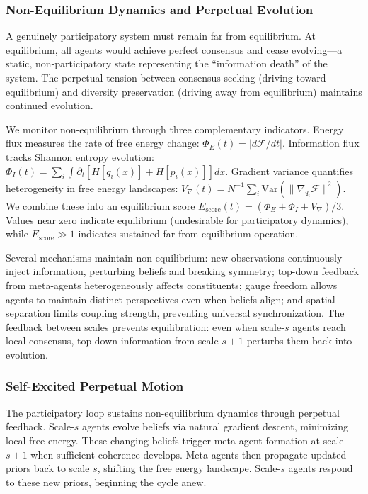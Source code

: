 \documentclass[11pt]{article}
\begin{document}
\subsubsection{Non-Equilibrium Dynamics and Perpetual Evolution}

A genuinely participatory system must remain far from equilibrium. At equilibrium, all agents would achieve perfect consensus and cease evolving---a static, non-participatory state representing the ``information death'' of the system. The perpetual tension between consensus-seeking (driving toward equilibrium) and diversity preservation (driving away from equilibrium) maintains continued evolution.

We monitor non-equilibrium through three complementary indicators. Energy flux measures the rate of free energy change: $\Phi_E(t) = |d\mathcal{F}/dt|$. Information flux tracks Shannon entropy evolution: $\Phi_I(t) = \sum_i \int \partial_t[H[q_i(x)] + H[p_i(x)]] dx$. Gradient variance quantifies heterogeneity in free energy landscapes: $V_{\nabla}(t) = N^{-1}\sum_i \mathrm{Var}(\|\nabla_{q_i} \mathcal{F}\|^2)$. We combine these into an equilibrium score $E_{\mathrm{score}}(t) = (\Phi_E + \Phi_I + V_{\nabla})/3$. Values near zero indicate equilibrium (undesirable for participatory dynamics), while $E_{\mathrm{score}} \gg 1$ indicates sustained far-from-equilibrium operation.

Several mechanisms maintain non-equilibrium: new observations continuously inject information, perturbing beliefs and breaking symmetry; top-down feedback from meta-agents heterogeneously affects constituents; gauge freedom allows agents to maintain distinct perspectives even when beliefs align; and spatial separation limits coupling strength, preventing universal synchronization. The feedback between scales prevents equilibration: even when scale-$s$ agents reach local consensus, top-down information from scale $s+1$ perturbs them back into evolution.

\subsubsection{Self-Excited Perpetual Motion}

The participatory loop sustains non-equilibrium dynamics through perpetual feedback. Scale-$s$ agents evolve beliefs via natural gradient descent, minimizing local free energy. These changing beliefs trigger meta-agent formation at scale $s+1$ when sufficient coherence develops. Meta-agents then propagate updated priors back to scale $s$, shifting the free energy landscape. Scale-$s$ agents respond to these new priors, beginning the cycle anew.
\end{document}
